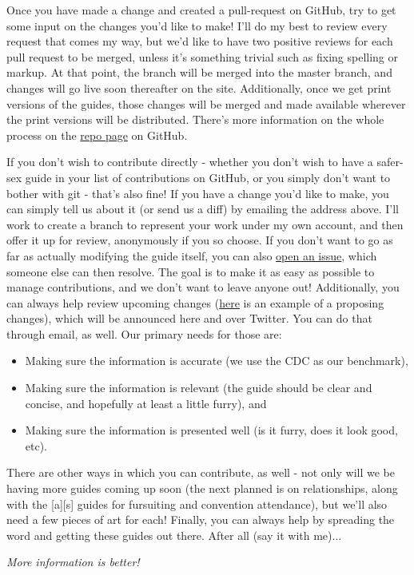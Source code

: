 Once you have made a change and created a pull-request on GitHub, try to get some input on the changes you'd like to make! I'll do my best to review every request that comes my way, but we'd like to have two positive reviews for each pull request to be merged, unless it's something trivial such as fixing spelling or markup. At that point, the branch will be merged into the master branch, and changes will go live soon thereafter on the site. Additionally, once we get print versions of the guides, those changes will be merged and made available wherever the print versions will be distributed. There's more information on the whole process on the \href{https://github.com/adjspecies/lsf-guides}{repo page} on GitHub.

If you don't wish to contribute directly - whether you don't wish to have a safer-sex guide in your list of contributions on GitHub, or you simply don't want to bother with git - that's also fine! If you have a change you'd like to make, you can simply tell us about it (or send us a diff) by emailing the address above. I'll work to create a branch to represent your work under my own account, and then offer it up for review, anonymously if you so choose. If you don't want to go as far as actually modifying the guide itself, you can also \href{https://github.com/adjspecies/lsf-guides/issues}{open an issue}, which someone else can then resolve. The goal is to make it as easy as possible to manage contributions, and we don't want to leave anyone out! Additionally, you can always help review upcoming changes (\href{https://github.com/adjspecies/lsf-guides/pull/1}{here} is an example of a proposing changes), which will be announced here and over Twitter. You can do that through email, as well. Our primary needs for those are:

\begin{itemize}
\tightlist
\item
  Making sure the information is accurate (we use the CDC as our benchmark),
\item
  Making sure the information is relevant (the guide should be clear and concise, and hopefully at least a little furry), and
\item
  Making sure the information is presented well (is it furry, does it look good, etc).
\end{itemize}

There are other ways in which you can contribute, as well - not only will we be having more guides coming up soon (the next planned is on relationships, along with the {[}a{]}{[}s{]} guides for fursuiting and convention attendance), but we'll also need a few pieces of art for each! Finally, you can always help by spreading the word and getting these guides out there. After all (say it with me)...

\emph{More information is better!}
